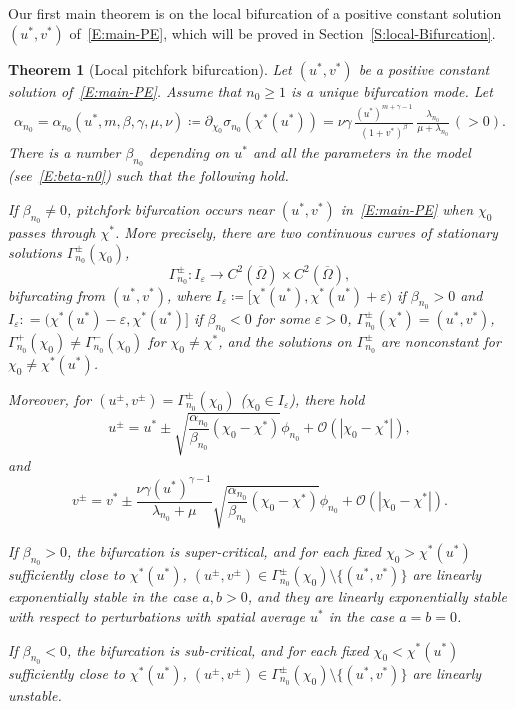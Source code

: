 \documentclass[11pt]{article} %
\newtheorem{theorem}{Theorem}[section] %
\theoremstyle{remark}
\theoremstyle{remark}
\numberwithin{equation}{section}
\numberwithin{figure}{section}
\numberwithin{table}{section}
\begin{document}
\medskip

Our first main theorem is on the local bifurcation of a positive constant
solution $(u^*, v^*)$ of~\eqref{E:main-PE}, which will be proved in
Section~\ref{S:local-Bifurcation}.


\begin{theorem}[Local pitchfork bifurcation]\label{T:local-bifurcation}
  Let $(u^*,v^*)$ be a positive constant solution of~\eqref{E:main-PE}. Assume
  that $n_0 \ge 1$ is a unique bifurcation mode. Let
  \begin{align}\label{E:alpha-n0}
    \alpha_{n_0}=\alpha_{n_0}(u^*,m,\beta,\gamma,\mu,\nu)
    \coloneqq \partial_{\chi_0}\sigma_{n_0}(\chi^*(u^*))
    = \nu\gamma\,\frac{(u^*)^{m+\gamma-1}}{(1+v^*)^\beta}\,
    \frac{\lambda_{n_0}}{\mu+\lambda_{n_0}}\,(>0).
  \end{align}
  There is a number $\beta_{n_0}$ depending on $u^*$ and all the parameters in
  the model (see~\eqref{E:beta-n0}) such that the following hold.


  If $\beta_{n_0}\not = 0$, pitchfork bifurcation occurs near $(u^*,v^*)$
  in~\eqref{E:main-PE} when $\chi_0$ passes through $\chi^*$. More precisely,
  there are two continuous curves of stationary solutions
  $\Gamma^\pm_{n_0}(\chi_0)$,
  \[
    \Gamma_{n_0}^{\pm}
    \colon I_\varepsilon
    \longrightarrow  C^2(\overline{\Omega}) \times C^2(\overline{\Omega}),
  \]
  bifurcating from $(u^*,v^*)$, where $I_\varepsilon\coloneqq [\chi^*(u^*),
  \chi^*(u^*) + \varepsilon)$ if $\beta_{n_0} > 0$ and $I_\varepsilon: =
  (\chi^*(u^*) - \varepsilon,\chi^*(u^*)]$ if $\beta_{n_0} < 0$ for some
  $\varepsilon > 0$, $\Gamma_{n_0}^\pm(\chi^*) = (u^*,v^*)$,
  $\Gamma_{n_0}^+(\chi_0)\not = \Gamma_{n_0}^-(\chi_0)$ for $\chi_0\not =
  \chi^*$, and the solutions on $\Gamma_{n_0}^{\pm}$ are nonconstant for $\chi_0
  \ne \chi^*(u^*)$.

  Moreover, for $(u^\pm,v^\pm) = \Gamma_{n_0}^\pm(\chi_0)$ ($\chi_0 \in
  I_\varepsilon$), there hold
  \[
    u^\pm=u^*\pm\sqrt{\frac{\alpha_{n_0}}{\beta_{n_0}}(\chi_0-\chi^*) }
    \phi_{n_0}+\mathcal{O}(|\chi_0-\chi^*|),
  \]
  and
  \[
    v^\pm=v^* \pm \frac{\nu \gamma (u^*)^{\gamma-1}}{\lambda_{n_0}+\mu}
    \sqrt{\frac{\alpha_{n_0}}{\beta_{n_0}}(\chi_0-\chi^*)}
    \phi_{n_0}+\mathcal{O}(|\chi_0-\chi^*|).
  \]

  If $\beta_{n_0} > 0$, the bifurcation is super-critical, and for each fixed
  $\chi_0 > \chi^*(u^*)$ sufficiently close to $\chi^*(u^*)$, $(u^\pm,v^\pm) \in
  \Gamma_{n_0}^\pm (\chi_0)\setminus \{(u^*,v^*)\}$ are linearly exponentially
  stable in the case $a, b > 0$, and they are linearly exponentially stable with
  respect to perturbations with spatial average $u^*$ in the case $a = b = 0$.

  If $\beta_{n_0} < 0$, the bifurcation is sub-critical, and for each fixed
  $\chi_0 < \chi^*(u^*)$ sufficiently close to $\chi^*(u^*)$, $(u^\pm,v^\pm) \in
  \Gamma_{n_0}^\pm (\chi_0)\setminus \{(u^*,v^*)\}$ are linearly unstable.
\end{theorem}
\end{document}
